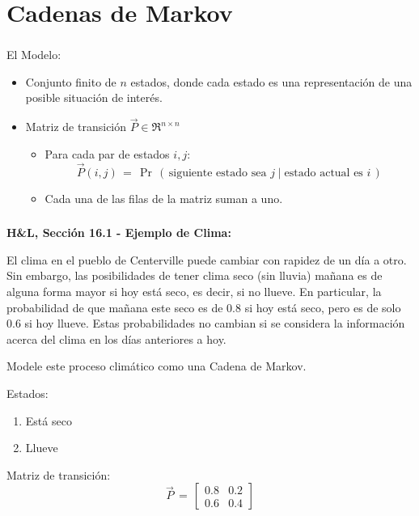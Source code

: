 \documentclass[ 10pt, xcolor = dvipsnames]{beamer}
\begin{document}
\section{Cadenas de Markov}

\begin{frame}[allowframebreaks]
\frametitle{\insertsection}

El Modelo: 
\begin{itemize}
\item Conjunto finito de $n$ estados, donde cada estado es una representaci\'on de una posible situaci\'on de inter\'es. 
\item Matriz de transici\'on $\vec{P} \in \Re^{n \times n}$
\begin{itemize}
\item Para cada par de estados $i,j$: 
\[
\vec{P}(i,j) \, = \, 
\Pr \, ( \, 
\text{siguiente estado sea } j \mid
\text{estado actual es } i \, )
\]
\item Cada una de las filas de la matriz suman a uno. 
\end{itemize}
\end{itemize}

\end{frame}

\begin{frame}[allowframebreaks]
\frametitle{\insertsection}

\textbf{H\&L, Secci\'on 16.1 - Ejemplo de Clima:}

El clima en el pueblo de Centerville puede cambiar con rapidez de un d\'ia a otro. Sin embargo, las posibilidades de tener clima seco (sin lluvia) ma\~nana es de alguna forma mayor si hoy est\'a seco, es decir, si no llueve. En particular, \linebreak la probabilidad de que ma\~nana este seco es de 0.8 si hoy est\'a seco, pero \linebreak es de solo 0.6 si hoy llueve. Estas probabilidades no cambian si se considera \linebreak la informaci\'on acerca del clima en los d\'ias anteriores a hoy. 

Modele este proceso clim\'atico como una Cadena de Markov. 
\framebreak

Estados: 
\begin{enumerate}
\item Est\'a seco
\item Llueve
\end{enumerate}

Matriz de transici\'on:
\[
\vec{P} \, = \, 
\left[
\begin{array}{cc}
0.8 & 0.2 \\ 0.6 & 0.4
\end{array}
\right]
\]

\end{frame}
\end{document}
